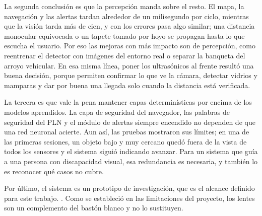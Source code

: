 La segunda conclusión es que la percepción manda sobre el resto. El mapa, la navegación
y las alertas tardan alrededor de un milisegundo por ciclo, mientras que la visión tarda
más de cien, y con los errores pasa algo similar; una distancia monocular equivocada o un
tapete tomado por hoyo se propagan hasta lo que escucha el usuario. Por eso las mejoras
con más impacto son de percepción, como reentrenar el detector con imágenes del entorno
real o separar la banqueta del arroyo vehicular. En esa misma línea, poner los
ultrasónicos al frente resultó una buena decisión, porque permiten confirmar lo que ve la
cámara, detectar vidrios y mamparas y dar por buena una llegada solo cuando la distancia
está verificada.

La tercera es que vale la pena mantener capas determinísticas por encima de los modelos
aprendidos. La capa de seguridad del navegador, las palabras de seguridad del PLN y el
módulo de alertas siempre encendido no dependen de que una red neuronal acierte. Aun así,
las pruebas mostraron sus límites; en una de las primeras sesiones, un objeto bajo y muy cercano
quedó fuera de la vista de todos los sensores y el sistema siguió indicando avanzar. Para
un sistema que guía a una persona con discapacidad visual, esa redundancia es necesaria,
y también lo es reconocer qué casos no cubre.

Por último, el sistema es un prototipo de investigación, que es el alcance definido para
este trabajo. . Como se estableció en las limitaciones del proyecto, los lentes
son un complemento del bastón blanco y no lo sustituyen.


